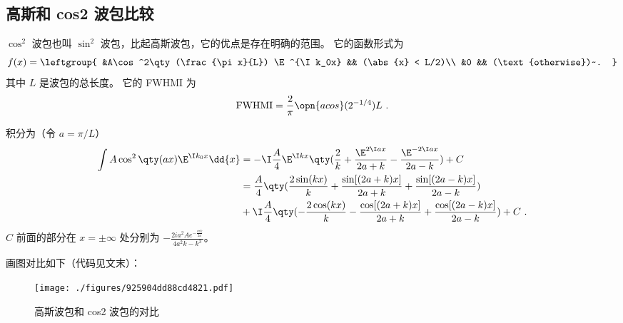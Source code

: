 \subsection{高斯和 cos2 波包比较}
$\cos^2$ 波包也叫 $\sin^2$ 波包，比起高斯波包，它的优点是存在明确的范围。 它的函数形式为
\begin{equation}\label{eq_GausPk_5}
f(x) = \leftgroup{
&A\cos^2\qty(\frac{\pi x}{L}) \E^{\I k_0x} && (\abs{x} < L/2)\\
&0 && (\text{otherwise})~.
}\end{equation}
其中 $L$ 是波包的总长度。 它的 FWHMI 为
\begin{equation}\label{eq_GausPk_4}
\text{FWHMI} = \frac{2}{\pi}\opn{acos}(2^{-1/4}) L~.
\end{equation}

积分为（令 $a = \pi/L$）
\begin{equation}\label{eq_GausPk_2} %
\begin{aligned}
\int A\cos^2\qty(a x) \E^{\I k_0x} \dd{x} &= -\I\frac{A}{4}\E^{\I kx}\qty(\frac{2}{k} +\frac{\E^{2\I ax}}{2a+k} -\frac{\E^{-2\I ax}}{2a-k}) + C\\
&= \frac{A}{4} \qty(\frac{2\sin(k x)}{k} +\frac{\sin[(2 a+k)x]}{2 a+k} +\frac{\sin[(2 a-k)x]}{2 a-k})\\
&+\I\frac{A}{4} \qty(-\frac{2\cos(k x)}{k} -\frac{\cos[(2 a+k)x]}{2 a+k} +\frac{\cos[(2 a-k)x]}{2 a-k}) + C~.
\end{aligned}
\end{equation}
$C$ 前面的部分在 $x = \pm\infty$ 处分别为 $-\frac{2 i a^2 A e^{-\frac{i \pi  k}{2 a}}}{4 a^2 k-k^3}$。

画图对比如下（代码见文末）：
\begin{figure}[ht]
\centering
\texttt{[image: ./figures/925904dd88cd4821.pdf]}
\caption{高斯波包和 cos2 波包的对比} \label{fig_GausPk_2}
\end{figure}

